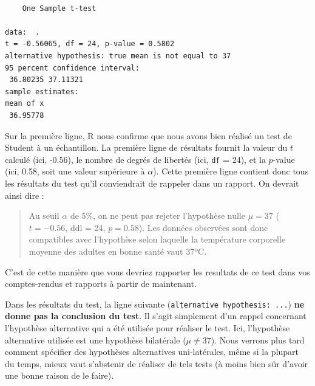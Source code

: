\documentclass[
  a4paper,
]{article}
\begin{document}
\begin{verbatim}

    One Sample t-test

data:  .
t = -0.56065, df = 24, p-value = 0.5802
alternative hypothesis: true mean is not equal to 37
95 percent confidence interval:
 36.80235 37.11321
sample estimates:
mean of x 
 36.95778 
\end{verbatim}

Sur la première ligne, R nous confirme que nous avons bien réalisé un test de Student à un échantillon. La première ligne de résultats fournit la valeur du \(t\) calculé (ici, -0.56), le nombre de degrés de libertés (ici, \texttt{df} = 24), et la \(p\)-value (ici, 0.58, soit une valeur supérieure à \(\alpha\)). Cette première ligne contient donc tous les résultats du test qu'il conviendrait de rappeler dans un rapport. On devrait ainsi dire :

\begin{quote}
Au seuil \(\alpha\) de 5\%, on ne peut pas rejeter l'hypothèse nulle \(\mu = 37\) (\(t = -0.56\), ddl = 24, \(p = 0.58\)). Les données observées sont donc compatibles avec l'hypothèse selon laquelle la température corporelle moyenne des adultes en bonne santé vaut 37ºC.
\end{quote}

C'est de cette manière que vous devriez rapporter les resultats de ce test dans vos comptes-rendus et rapports à partir de maintenant.

Dans les résultats du test, la ligne suivante (\texttt{alternative\ hypothesis:\ ...}) \textbf{ne donne pas la conclusion du test}. Il s'agit simplement d'un rappel concernant l'hypothèse alternative qui a été utilisée pour réaliser le test. Ici, l'hypothèse alternative utilisée est une hypothèse bilatérale (\(\mu \neq 37\)). Nous verrons plus tard comment spécifier des hypothèses alternatives uni-latérales, même si la plupart du temps, mieux vaut s'abstenir de réaliser de tels tests (à moins bien sûr d'avoir une bonne raison de le faire).
\end{document}

